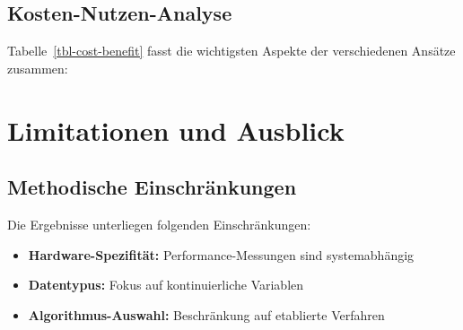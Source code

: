 \documentclass[
  ngerman,
  10pt,
  letterpaper,
]{book}
\providecommand{\tightlist}{%
  \setlength{\itemsep}{0pt}\setlength{\parskip}{0pt}}
\begin{document}
\subsection{Kosten-Nutzen-Analyse}\label{kosten-nutzen-analyse}

Tabelle~\ref{tbl-cost-benefit} fasst die wichtigsten Aspekte der
verschiedenen Ansätze zusammen:

\begin{table}

\caption{\label{tbl-cost-benefit}Bewertungsmatrix verschiedener
Verfahren (1=schlecht, 5=sehr gut)}


\end{table}%

\section{Limitationen und Ausblick}\label{limitationen-und-ausblick}

\subsection{Methodische
Einschränkungen}\label{methodische-einschruxe4nkungen}

Die Ergebnisse unterliegen folgenden Einschränkungen:

\begin{itemize}
\tightlist
\item
  \textbf{Hardware-Spezifität:} Performance-Messungen sind
  systemabhängig
\item
  \textbf{Datentypus:} Fokus auf kontinuierliche Variablen
\item
  \textbf{Algorithmus-Auswahl:} Beschränkung auf etablierte Verfahren
\end{itemize}
\end{document}
